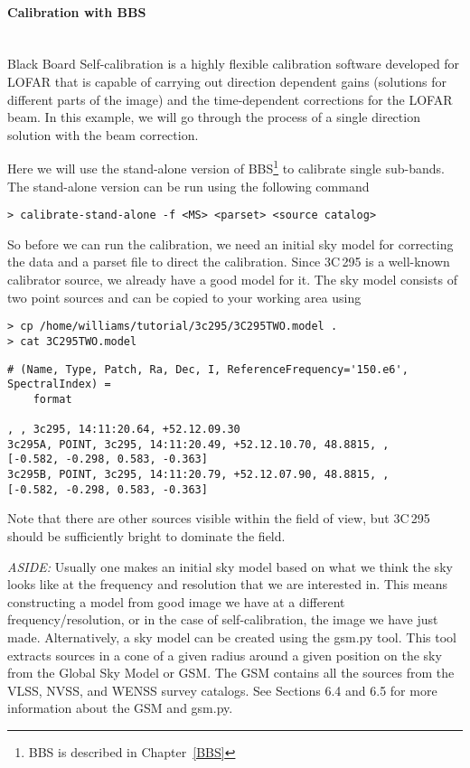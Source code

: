 \paragraph{Calibration with BBS}\mbox{}\\

Black Board Self-calibration is a highly flexible calibration software developed for LOFAR that is capable of carrying out direction dependent gains (solutions for different parts of the image) and the time-dependent corrections for the LOFAR beam. In this example, we will go through the process of a single direction solution with the beam correction. 

Here we will use the stand-alone version of BBS\footnote{BBS is described in Chapter~\ref{BBS}} to calibrate single sub-bands. The stand-alone version can be run using the following command
\begin{verbatim}
> calibrate-stand-alone -f <MS> <parset> <source catalog>
\end{verbatim}

So before we can run the calibration, we need an initial sky model for correcting the data and a parset file to direct the calibration. Since 3C\,295 is a well-known calibrator source, we already have a good model for it. The sky model consists of two point sources and can be copied to your working area using
\begin{verbatim}
> cp /home/williams/tutorial/3c295/3C295TWO.model .
> cat 3C295TWO.model
\end{verbatim}
\begin{lstlisting}
# (Name, Type, Patch, Ra, Dec, I, ReferenceFrequency='150.e6', SpectralIndex) = 
    format

, , 3c295, 14:11:20.64, +52.12.09.30
3c295A, POINT, 3c295, 14:11:20.49, +52.12.10.70, 48.8815, , 
[-0.582, -0.298, 0.583, -0.363]
3c295B, POINT, 3c295, 14:11:20.79, +52.12.07.90, 48.8815, , 
[-0.582, -0.298, 0.583, -0.363]
\end{lstlisting}
Note that there are other sources visible within the field of view, but 3C\,295 should be sufficiently bright to dominate the field.


\textit{ASIDE:} Usually one makes an initial sky model based on what we think the sky looks like at the frequency and resolution that we are interested in. This means constructing a model from good image we have at a different frequency/resolution, or in the case of self-calibration, the image we have just made. Alternatively, a sky model can be created using the gsm.py tool. This tool extracts sources in a cone of a given radius around a given position on the sky from the Global Sky Model or GSM. The GSM contains all the sources from the VLSS, NVSS, and WENSS survey catalogs. See Sections 6.4 and 6.5 for more information about the GSM and gsm.py.

